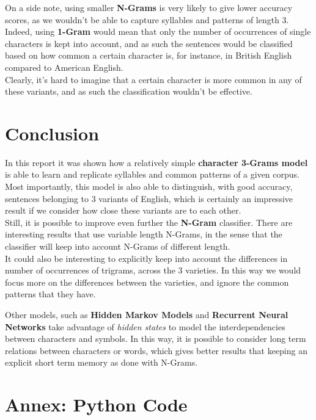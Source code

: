 \documentclass[
12pt,
a4paper,
oneside,
headinclude,
footinclude]{article}
\theoremstyle{definition} %
\begin{document}
On a side note, using smaller \textbf{N-Grams} is very likely to give lower accuracy scores, as we wouldn't be able to capture syllables and patterns of length 3.\\
Indeed, using \textbf{1-Gram} would mean that only the number of occurrences of single characters is kept into account, and as such the sentences would be classified based on how common a certain character is, for instance, in British English compared to American English.\\
Clearly, it's hard to imagine that a certain character is more common in any of these variants, and as such the classification wouldn't be effective.

\section{Conclusion}
In this report it was shown how a relatively simple \textbf{character 3-Grams model} is able to learn and replicate syllables and common patterns of a given corpus.\\
Most importantly, this model is also able to distinguish, with good accuracy, sentences belonging to 3 variants of English, which is certainly an impressive result if we consider how close these variants are to each other.\\

Still, it is possible to improve even further the \textbf{N-Gram} classifier. There are interesting results \cite{kanaris2007words} that use variable length N-Grams, in the sense that the classifier will keep into account N-Grams of different length.\\
It could also be interesting to explicitly keep into account the differences in number of occurrences of trigrams, across the 3 varieties. In this way we would focus more on the differences between the varieties, and ignore the common patterns that they have.

Other models, such as \textbf{Hidden Markov Models}\cite{frasconi2002hidden} and \textbf{Recurrent Neural Networks}\cite{lai2015recurrent} take advantage of \textit{hidden states} to model the interdependencies between characters and symbols. In this way, it is possible to consider long term relations between characters or words, which gives better results that keeping an explicit short term memory as done with N-Grams.

\section{Annex: Python Code}
\end{document}
